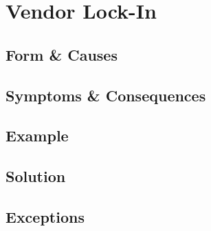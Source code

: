 \section{Vendor Lock-In}

\subsection{Form \& Causes}

\subsection{Symptoms \& Consequences}

\subsection{Example}

\subsection{Solution}

\subsection{Exceptions}